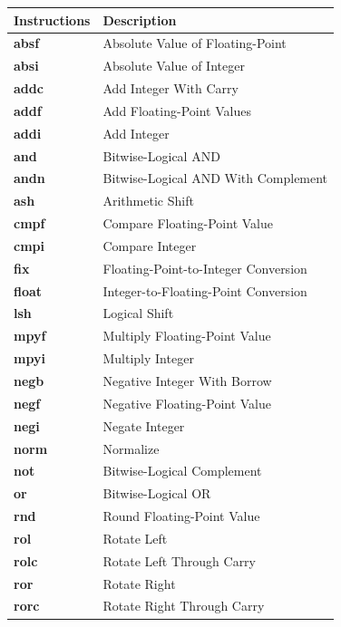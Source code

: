\begin{table}[!p]
\begin{center}
	\small
	\begin{tabular}{|p{3.0cm}|p{10.0cm}|}
	\hline
	\textbf{Instructions} & \textbf{Description}\\
	\hline
	\textbf{absf} & Absolute Value of Floating-Point\\
	\hline
	\textbf{absi} & Absolute Value of Integer\\
	\hline
	\textbf{addc} & Add Integer With Carry\\
	\hline
	\textbf{addf} & Add Floating-Point Values\\
	\hline
	\textbf{addi} & Add Integer\\
	\hline
	\textbf{and} & Bitwise-Logical AND\\
	\hline
	\textbf{andn} & Bitwise-Logical AND With Complement\\
	\hline
	\textbf{ash} & Arithmetic Shift\\
	\hline
	\textbf{cmpf} & Compare Floating-Point Value\\
	\hline
	\textbf{cmpi} & Compare Integer\\
	\hline
	\textbf{fix} & Floating-Point-to-Integer Conversion\\
	\hline
	\textbf{float} & Integer-to-Floating-Point Conversion\\
	\hline
	\textbf{lsh} & Logical Shift\\
	\hline
	\textbf{mpyf} & Multiply Floating-Point Value\\
	\hline
	\textbf{mpyi} & Multiply Integer\\
	\hline
	\textbf{negb} & Negative Integer With Borrow\\
	\hline
	\textbf{negf} & Negative Floating-Point Value\\
	\hline
	\textbf{negi} & Negate Integer\\
	\hline
	\textbf{norm} & Normalize\\
	\hline
	\textbf{not} & Bitwise-Logical Complement\\
	\hline
	\textbf{or} & Bitwise-Logical OR\\
	\hline
	\textbf{rnd} & Round Floating-Point Value\\
	\hline
	\textbf{rol} & Rotate Left\\
	\hline
	\textbf{rolc} & Rotate Left Through Carry\\
	\hline
	\textbf{ror} & Rotate Right\\
	\hline
	\textbf{rorc} & Rotate Right Through Carry\\

\end{tabular}
\end{center}
\end{table}

